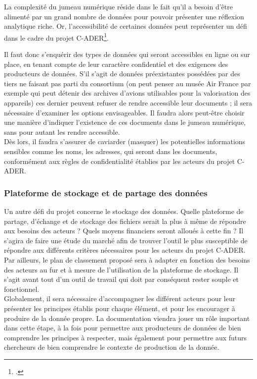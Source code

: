 La complexité du jumeau numérique réside dans le fait qu'il a besoin d'être alimenté par un grand nombre de données pour pouvoir présenter une réflexion analytique riche. Or, l'accessibilité de certaines données peut représenter un défi dans le cadre du projet C-ADER\footcite{EssorJumeauxNumeriques2024}.

Il faut donc s'enquérir des types de données qui seront accessibles en ligne ou sur place, en tenant compte de leur caractère confidentiel et des exigences des producteurs de données. S’il s’agit de données préexistantes possédées par des tiers ne faisant pas parti du consortium (on peut penser au musée Air France par exemple qui peut détenir des archives d'avions utilisables pour la valorisation des appareils) ces dernier peuvent refuser de rendre accessible leur documents ; il sera nécessaire d’examiner les options envisageables. Il faudra alors peut-être choisir une manière d’indiquer l’existence de ces documents dans le jumeau numérique, sans pour autant les rendre accessible.\\

Dès lors, il faudra s’assurer de caviarder (masquer) les potentielles informations sensibles comme les noms, les adresses, qui seront dans les documents, conformément aux règles de confidentialité établies par les acteurs du projet C-ADER.

            \subsubsection{Plateforme de stockage et de partage des données}

Un autre défi du projet concerne le stockage des données. Quelle plateforme de partage, d’échange et de stockage des fichiers serait la plus à même de répondre aux besoins des acteurs ? Quels moyens financiers seront alloués à cette fin ? Il s’agira de faire une étude du marché afin de trouver l’outil le plus susceptible de répondre aux différents critères nécessaires pour les acteurs du projet C-ADER.\\

Par ailleurs, le plan de classement proposé sera à adapter en fonction des besoins des acteurs au fur et à mesure de l'utilisation de la plateforme de stockage. Il s’agit avant tout d’un outil de travail qui doit par conséquent rester souple et fonctionnel.\\

Globalement, il sera nécessaire d’accompagner les différent acteurs pour leur présenter les principes établis pour chaque élément, et pour les encourager à produire de la donnée propre. La documentation viendra jouer un rôle important dans cette étape, à la fois pour permettre aux producteurs de données de bien comprendre les principes à respecter, mais également pour permettre aux futurs chercheurs de bien comprendre le contexte de production de la donnée.

